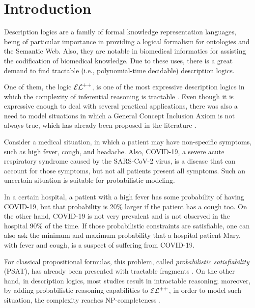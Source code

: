 
\chapter{Introduction}
\label{cap:introduction}

Description logics are a family of formal knowledge representation languages, being of particular importance in providing a logical formalism for ontologies and the Semantic Web. Also, they are notable in biomedical informatics for assisting the codification of biomedical knowledge. Due to these uses, there is a great demand to find tractable (i.e., polynomial-time decidable) description logics.

One of them, the logic $\mathcal{EL}^{++}$, is one of the most expressive description logics in which the complexity of inferential reasoning is tractable \citep{Baader2005a}. Even though it is expressive enough to deal with several practical applications, there was also a need to model situations in which a General Concept Inclusion Axiom is not always true, which has already been proposed in the literature \citep{boole1854investigation}.

\begin{example}
  \label{exmp:real-example}
Consider a medical situation, in which a patient may have non-specific symptoms, such as high fever, cough, and headache. Also, COVID-19, a severe acute respiratory syndrome caused by the  SARS-CoV-2 virus, is a disease that can account for those symptoms, but not all patients present all symptoms. Such an uncertain situation is suitable for probabilistic modeling.

In a certain hospital, a patient with a high fever has some probability of having COVID-19, but that probability is 20\% larger if the patient has a cough too. On the other hand, COVID-19 is not very prevalent and is not observed in the hospital 90\% of the time. If those probabilistic constraints are satisfiable, one can also ask the minimum and maximum probability that a hospital patient Mary, with fever and cough, is a suspect of suffering from COVID-19.
\end{example}

For classical propositional formulas, this problem, called \emph{probabilistic satisfiability} (PSAT), has already been presented with tractable fragments \citep{andersen2001easy}. On the other hand, in description logics, most studies result in intractable reasoning; moreover, by adding probabilistic reasoning capabilities to $\mathcal{EL}^{++}$, in order to model such situation, the complexity reaches NP-completeness \citep{Fin2019b}. 
    
